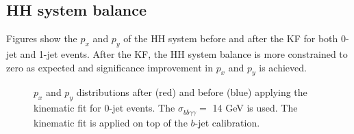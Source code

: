 \subsection{HH system balance}
Figures show the $p_x$ and $p_y$ of the HH system before and after the KF for both 0-jet and 1-jet events. After the KF, the HH system balance is more constrained to zero as expected and significance improvement in $p_x$ and $p_y$ is achieved. 

\begin{figure}[htbp]
   \centering
   \begin{tcolorbox}[colback=black!5!white,colframe=white!75!black]
   \caption{$p_x$ and $p_y$ distributions after (red) and before (blue) applying the kinematic fit for 0-jet events. The $\sigma_{b\bar{b}\gamma\gamma} = $ 14 GeV is used. The kinematic fit is applied on top of the $b$-jet calibration.}
   \label{fig:Adx4:HH:0Jet}
   \end{tcolorbox}
   
\end{figure}
